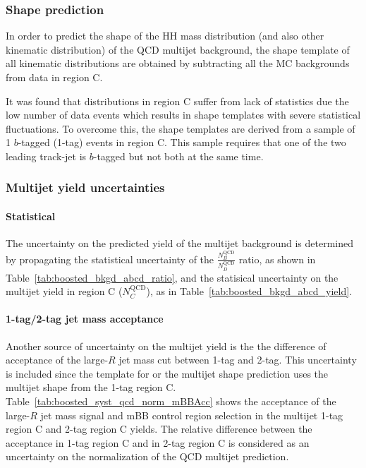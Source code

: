 \FloatBarrier
 
%
%
\subsubsection{Shape prediction}
\label{sec:boosted_bkgd_qcdmultijet_shape}
In order to predict the shape of the HH mass distribution (and also other kinematic distribution) of the QCD multijet background, the shape template of all kinematic distributions are obtained by subtracting all the MC backgrounds from data
in region C.
 
It was found that distributions in region C suffer from lack of statistics due the low number of data events which results in shape templates with severe statistical fluctuations. To overcome this, the shape templates are derived from a sample of 1 $b$-tagged (1-tag) events in region C. This sample requires that one of the two leading track-jet is $b$-tagged but not both at the same time.%
 
%
%
\subsubsection{Multijet yield uncertainties}
\label{sec:boosted_bkgd_qcdmultijet_yield_unc}
 
\paragraph{Statistical} 
The uncertainty on the predicted yield of the multijet background is determined by propagating the statistical uncertainty
of the $\frac{N_B^\text{QCD}}{N_D^\text{QCD}}$ ratio, as shown in Table~\ref{tab:boosted_bkgd_abcd_ratio}, and the statisical
uncertainty on the multijet yield in region C ($N_C^\text{QCD}$), as in Table~\ref{tab:boosted_bkgd_abcd_yield}.
 
\paragraph{1-tag/2-tag jet mass acceptance} 
Another source of uncertainty on the multijet yield is the  
the difference of acceptance of the large-$R$ jet mass cut between 1-tag and 2-tag.
This uncertainty is included since the template for or the multijet shape prediction uses the multijet shape
from the 1-tag region C. Table~\ref{tab:boosted_syst_qcd_norm_mBBAcc} shows the acceptance
of the large-$R$ jet mass signal and mBB control region selection in the multijet 1-tag region C and 2-tag region C yields.
The relative difference between the acceptance in 1-tag region C and in 2-tag region C is considered as an uncertainty on the normalization
of the QCD multijet prediction.
 

